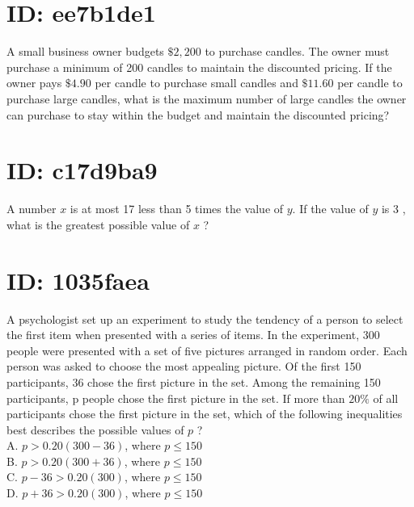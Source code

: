










































\section*{ID: ee7b1de1}
A small business owner budgets $\$ 2,200$ to purchase candles. The owner must purchase a minimum of 200 candles to maintain the discounted pricing. If the owner pays $\$ 4.90$ per candle to purchase small candles and $\$ 11.60$ per candle to purchase large candles, what is the maximum number of large candles the owner can purchase to stay within the budget and maintain the discounted pricing?

\section*{ID: c17d9ba9}
A number $x$ is at most 17 less than 5 times the value of $y$. If the value of $y$ is 3 , what is the greatest possible value of $x$ ?

\section*{ID: 1035faea}
A psychologist set up an experiment to study the tendency of a person to select the first item when presented with a series of items. In the experiment, 300 people were presented with a set of five pictures arranged in random order. Each person was asked to choose the most appealing picture. Of the first 150 participants, 36 chose the first picture in the set. Among the remaining 150 participants, p people chose the first picture in the set. If more than $20 \%$ of all participants chose the first picture in the set, which of the following inequalities best describes the possible values of $p$ ?\\
A. $p>0.20(300-36)$, where $p \leq 150$\\
B. $p>0.20(300+36)$, where $p \leq 150$\\
C. $p-36>0.20(300)$, where $p \leq 150$\\
D. $p+36>0.20(300)$, where $p \leq 150$

